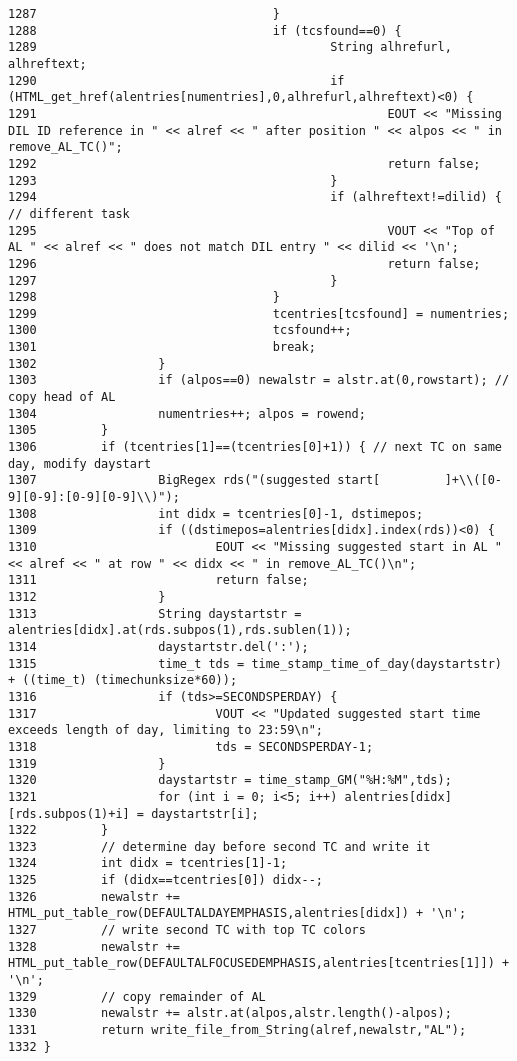 \begin{verbatim}
1287                                 }
1288                                 if (tcsfound==0) {
1289                                         String alhrefurl, alhreftext;
1290                                         if (HTML_get_href(alentries[numentries],0,alhrefurl,alhreftext)<0) {
1291                                                 EOUT << "Missing DIL ID reference in " << alref << " after position " << alpos << " in remove_AL_TC()";
1292                                                 return false;
1293                                         }
1294                                         if (alhreftext!=dilid) { // different task
1295                                                 VOUT << "Top of AL " << alref << " does not match DIL entry " << dilid << '\n';
1296                                                 return false;
1297                                         }
1298                                 }
1299                                 tcentries[tcsfound] = numentries;
1300                                 tcsfound++;
1301                                 break;
1302                 }
1303                 if (alpos==0) newalstr = alstr.at(0,rowstart); // copy head of AL
1304                 numentries++; alpos = rowend;
1305         }
1306         if (tcentries[1]==(tcentries[0]+1)) { // next TC on same day, modify daystart
1307                 BigRegex rds("(suggested start[         ]+\\([0-9][0-9]:[0-9][0-9]\\)");
1308                 int didx = tcentries[0]-1, dstimepos;
1309                 if ((dstimepos=alentries[didx].index(rds))<0) {
1310                         EOUT << "Missing suggested start in AL " << alref << " at row " << didx << " in remove_AL_TC()\n";
1311                         return false;
1312                 }
1313                 String daystartstr = alentries[didx].at(rds.subpos(1),rds.sublen(1));
1314                 daystartstr.del(':');
1315                 time_t tds = time_stamp_time_of_day(daystartstr) + ((time_t) (timechunksize*60));
1316                 if (tds>=SECONDSPERDAY) {
1317                         VOUT << "Updated suggested start time exceeds length of day, limiting to 23:59\n";
1318                         tds = SECONDSPERDAY-1;
1319                 }
1320                 daystartstr = time_stamp_GM("%H:%M",tds);
1321                 for (int i = 0; i<5; i++) alentries[didx][rds.subpos(1)+i] = daystartstr[i];
1322         }
1323         // determine day before second TC and write it
1324         int didx = tcentries[1]-1;
1325         if (didx==tcentries[0]) didx--;
1326         newalstr += HTML_put_table_row(DEFAULTALDAYEMPHASIS,alentries[didx]) + '\n';
1327         // write second TC with top TC colors
1328         newalstr += HTML_put_table_row(DEFAULTALFOCUSEDEMPHASIS,alentries[tcentries[1]]) + '\n';
1329         // copy remainder of AL
1330         newalstr += alstr.at(alpos,alstr.length()-alpos);
1331         return write_file_from_String(alref,newalstr,"AL");
1332 }
\end{verbatim}\normalsize 
{}
